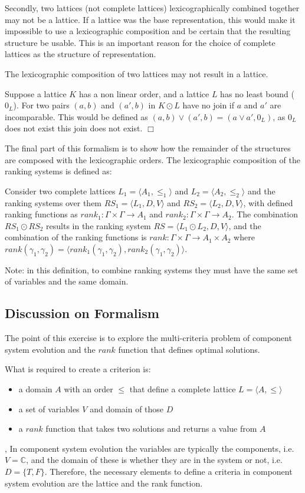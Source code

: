 Secondly, two lattices (not complete lattices) lexicographically combined together may not be a lattice. 
If a lattice was the base representation, this would make it impossible to use a lexicographic composition and be certain that the resulting structure be usable.
This is an important reason for the choice of complete lattices as the structure of representation.
\begin{prop}
The lexicographic composition of two lattices may not result in a lattice.
\end{prop}
\begin{prof}
Suppose a lattice $K$ has a non linear order, and a lattice $L$ has no least bound ($0_L$). 
For two pairs $(a,b)$ and $(a',b)$ in $K \odot L$ have no join if $a$ and $a'$ are incomparable.
This would be defined as $(a,b) \vee (a',b) = (a \vee a',0_L)$, as $0_L$ does not exist this join does not exist.
$\Box$\end{prof}

The final part of this formalism is to show how the remainder of the structures are composed with the lexicographic orders.
The lexicographic composition of the ranking systems is defined as:
\begin{defs}
Consider two complete lattices $L_1 = \langle A_1, \leq_1 \rangle$ and $L_2 = \langle A_2,\leq_2 \rangle$ and
the ranking systems over them $RS_1 = \langle L_1,D,V \rangle $ and $RS_2 = \langle L_2,D,V \rangle$,
with defined ranking functions as $rank_1: \Gamma \times \Gamma \rightarrow A_1 $ and $rank_2: \Gamma \times \Gamma \rightarrow A_2$.
The combination $RS_1 \odot RS_2$  results in the ranking system 
$RS = \langle L_1 \odot L_2, D, V \rangle$, 
and the combination of the ranking functions is 
$rank: \Gamma \times \Gamma \rightarrow A_1 \times A_2$ where $rank(\gamma_1,\gamma_2) = \langle rank_1(\gamma_1,\gamma_2), rank_2(\gamma_1,\gamma_2) \rangle$.
\end{defs}
Note: in this definition, to combine ranking systems they must have the same set of variables and the same domain.

\subsection{Discussion on Formalism}
The point of this exercise is to explore the multi-criteria problem of component system evolution and the $rank$ function that defines optimal solutions.

What is required to create a criterion is: 
\begin{itemize}
  \item a domain $A$ with an order $\leq$ that define a complete lattice $L = \langle A, \leq \rangle$
  \item a set of variables $V$ and domain of those $D$
  \item a $rank$ function that takes two solutions and returns a value from $A$
\end{itemize}, 
In component system evolution the variables are typically the components, i.e. $ V = \mathbb{C}$, and the domain of these is whether they are in the system or not, i.e. $D = \{T,F\}$.
Therefore, the necessary elements to define a criteria in component system evolution are the lattice and the rank function.

